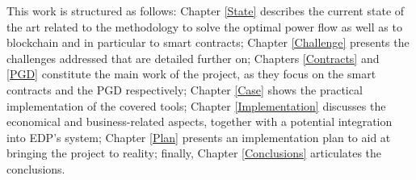 This work is structured as follows: Chapter \ref{State} describes the current state of the art related to the methodology to solve the optimal power flow as well as to blockchain and in particular to smart contracts; Chapter \ref{Challenge} presents the challenges addressed that are detailed further on; Chapters \ref{Contracts} and \ref{PGD} constitute the main work of the project, as they focus on the smart contracts and the PGD respectively; Chapter \ref{Case} shows the practical implementation of the covered tools; Chapter \ref{Implementation} discusses the economical and business-related aspects, together with a potential integration into EDP's system; Chapter \ref{Plan} presents an implementation plan to aid at bringing the project to reality; finally, Chapter \ref{Conclusions} articulates the conclusions.

